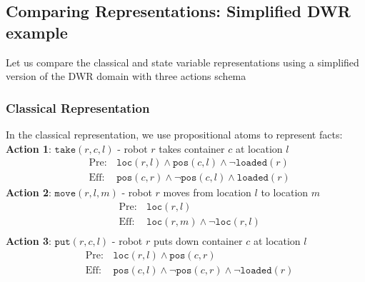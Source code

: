 \documentclass[a4paper]{article}
\theoremstyle{definition}
\begin{document}
\subsection{Comparing Representations: Simplified DWR example}
Let us compare the classical and state variable representations using a simplified version of the DWR domain with three actions schema 
\subsubsection{Classical Representation}
In the classical representation, we use propositional atoms to represent facts:
\vspace{1em}
\noindent
\newline
\textbf{Action 1}: \( \texttt{take}(r,c,l) \) - robot \( r \) takes container \( c \) at location $l$
\begin{align*}
    &\mathrm{Pre}: & \texttt{loc}(r,l) \wedge \texttt{pos}(c,l) \wedge \lnot \texttt{loaded}(r) \\
    &\mathrm{Eff}: & \texttt{pos}(c,r) \wedge \lnot \texttt{pos}(c,l) \wedge \texttt{loaded}(r)
\end{align*}
\textbf{Action 2}: \( \texttt{move}(r,l,m) \) - robot \( r \) moves from location \( l \) to location $m$ 
\begin{align*}
    &\mathrm{Pre}: & \texttt{loc}(r,l)\\
    &\mathrm{Eff}: & \texttt{loc}(r,m)\wedge \lnot \texttt{loc}(r,l)\\
\end{align*}
\textbf{Action 3}: \( \texttt{put}(r,c,l) \) - robot \( r \) puts down container \( c \) at location \( l \)    
\begin{align*}
    &\mathrm{Pre}: & \texttt{loc}(r,l) \wedge \texttt{pos}(c,r)\\
    &\mathrm{Eff}: & \texttt{pos}(c,l) \wedge \lnot \texttt{pos}(c,r) \wedge \lnot \texttt{loaded}(r)\\
\end{align*}
\end{document}
